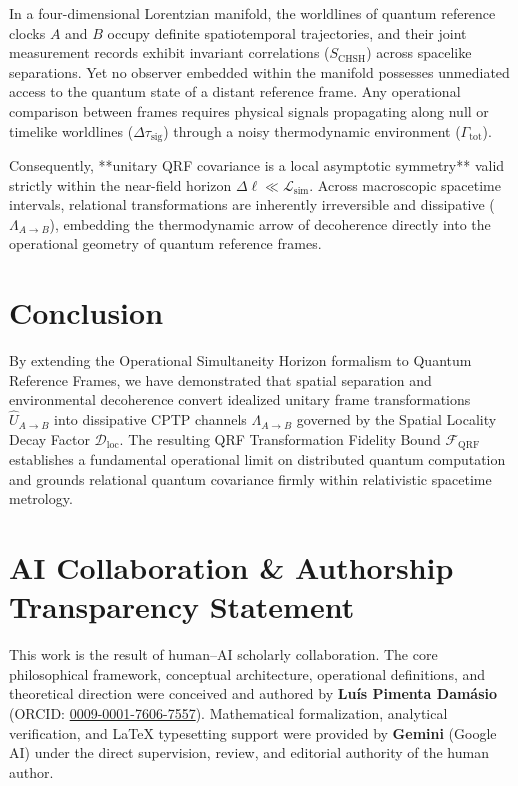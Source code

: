 \documentclass[11pt,a4paper]{article}
\begin{document}
In a four-dimensional Lorentzian manifold, the worldlines of quantum reference clocks $A$ and $B$ occupy definite spatiotemporal trajectories, and their joint measurement records exhibit invariant correlations ($S_{\mathrm{CHSH}}$) across spacelike separations. Yet no observer embedded within the manifold possesses unmediated access to the quantum state of a distant reference frame. Any operational comparison between frames requires physical signals propagating along null or timelike worldlines ($\Delta\tau_{\mathrm{sig}}$) through a noisy thermodynamic environment ($\Gamma_{\mathrm{tot}}$).

Consequently, **unitary QRF covariance is a local asymptotic symmetry** valid strictly within the near-field horizon $\Delta\ell \ll \mathcal{L}_{\mathrm{sim}}$. Across macroscopic spacetime intervals, relational transformations are inherently irreversible and dissipative ($\Lambda_{A \to B}$), embedding the thermodynamic arrow of decoherence directly into the operational geometry of quantum reference frames.

\section{Conclusion}

By extending the Operational Simultaneity Horizon formalism to Quantum Reference Frames, we have demonstrated that spatial separation and environmental decoherence convert idealized unitary frame transformations $\hat{U}_{A \to B}$ into dissipative CPTP channels $\Lambda_{A \to B}$ governed by the Spatial Locality Decay Factor $\mathcal{D}_{\mathrm{loc}}$. The resulting QRF Transformation Fidelity Bound $\mathcal{F}_{\mathrm{QRF}}$ establishes a fundamental operational limit on distributed quantum computation and grounds relational quantum covariance firmly within relativistic spacetime metrology.

\section*{AI Collaboration \& Authorship Transparency Statement}

This work is the result of human--AI scholarly collaboration. The core philosophical framework, conceptual architecture, operational definitions, and theoretical direction were conceived and authored by \textbf{Luís Pimenta Damásio} (ORCID: \href{https://orcid.org/0009-0001-7606-7557}{0009-0001-7606-7557}). Mathematical formalization, analytical verification, and LaTeX typesetting support were provided by \textbf{Gemini} (Google AI) under the direct supervision, review, and editorial authority of the human author.
\end{document}
